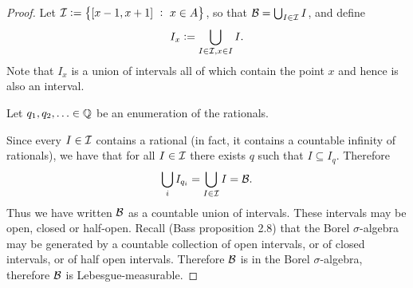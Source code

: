 \begin{proof}
  Let $\mathcal I := \big\{[x-1, x+1] ~:~ {x \in A} \big\}$, so that $\mathcal B = \bigcup_{I \in \mathcal I} I$, and define
  \begin{align*}
    I_x := \bigcup_{I \in \mathcal I, x \in I} I.
  \end{align*}
  Note that $I_x$ is a union of intervals all of which contain the point $x$ and hence is also an interval.

  Let $q_1, q_2, \ldots \in \mathbb{Q}$ be an enumeration of the rationals.

  Since every $I \in \mathcal I$ contains a rational (in fact, it contains a countable infinity of rationals), we
  have that for all $I \in \mathcal I$ there exists $q$ such that $I \subseteq I_q$. Therefore
  \begin{align*}
    \bigcup_{i} I_{q_i} = \bigcup_{I \in \mathcal I} I = \mathcal B.
  \end{align*}
  Thus we have written $\mathcal B$ as a countable union of intervals. These intervals may be open, closed or
  half-open. Recall (Bass proposition 2.8) that the Borel $\sigma$-algebra may be generated by a countable
  collection of open intervals, or of closed intervals, or of half open intervals. Therefore $\mathcal B$ is in the
  Borel $\sigma$-algebra, therefore $\mathcal B$ is Lebesgue-measurable.
\end{proof}
